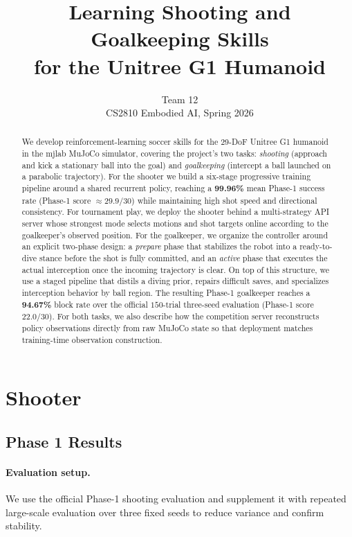 \documentclass{article}
\title{\textbf{Learning Shooting and Goalkeeping Skills\\
for the Unitree G1 Humanoid}}
\author{Team 12\\ %
CS2810 Embodied AI, Spring 2026}
\date{}
\begin{document}
\maketitle

\begin{abstract}
\noindent
We develop reinforcement-learning soccer skills for the 29-DoF Unitree G1
humanoid in the mjlab MuJoCo simulator, covering the project's two tasks:
\emph{shooting} (approach and kick a stationary ball into the goal) and
\emph{goalkeeping} (intercept a ball launched on a parabolic trajectory). For
the shooter we build a six-stage progressive training pipeline around a shared
recurrent policy, reaching a \textbf{99.96\%} mean Phase-1 success rate
(Phase-1 score $\approx 29.9/30$) while maintaining high shot speed and
directional consistency. For tournament play, we deploy the shooter behind a
multi-strategy API server whose strongest mode selects motions and shot targets
online according to the goalkeeper's observed position. For the goalkeeper, we
organize the controller around an explicit two-phase design: a \emph{prepare}
phase that stabilizes the robot into a ready-to-dive stance before the shot is
fully committed, and an \emph{active} phase that executes the actual
interception once the incoming trajectory is clear. On top of this structure,
we use a staged pipeline that distils a diving prior, repairs difficult saves,
and specializes interception behavior by ball region. The resulting Phase-1
goalkeeper reaches a \textbf{94.67\%} block rate over the official
$150$-trial three-seed evaluation (Phase-1 score $22.0/30$). For both tasks,
we also describe how the competition server reconstructs policy observations
directly from raw MuJoCo state so that deployment matches training-time
observation construction.
\end{abstract}

\section{Shooter}\label{part:shooter}

\subsection{Phase 1 Results}\label{sec:sh-phase1}

\paragraph{Evaluation setup.} We use the official Phase-1 shooting evaluation
and supplement it with repeated large-scale evaluation over three fixed seeds to
reduce variance and confirm stability.
\end{document}
